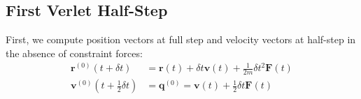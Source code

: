 \subsection{First Verlet Half-Step}
\label{sec:rattle-verlet-1}
\par First, we compute position vectors at full step and velocity vectors at half-step in the absence of constraint forces:
\begin{equation}
\label{eq:rattle-verlet-1}
\begin{aligned}
	\mathbf{r}^{(0)}(t + \delta t) &= \mathbf{r}(t) + \delta t \mathbf{v}(t) + \frac{1}{2m}\delta t^2 \mathbf{F}(t) \\
	\mathbf{v}^{(0)}(t + \frac{1}{2} \delta t) &= \mathbf{q}^{(0)} = \mathbf{v}(t) + \frac{1}{2} \delta t \mathbf{F}(t)
\end{aligned}
\end{equation}